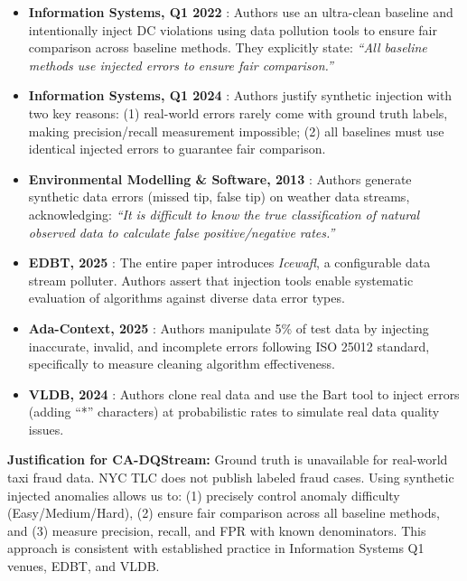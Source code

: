 \begin{itemize}
    \item \textbf{Information Systems, Q1 2022} \citep{DCRepair2022}: Authors use an ultra-clean baseline and intentionally inject DC violations using data pollution tools to ensure fair comparison across baseline methods. They explicitly state: \emph{``All baseline methods use injected errors to ensure fair comparison.''}

    \item \textbf{Information Systems, Q1 2024} \citep{DCRepair2024}: Authors justify synthetic injection with two key reasons: (1) real-world errors rarely come with ground truth labels, making precision/recall measurement impossible; (2) all baselines must use identical injected errors to guarantee fair comparison.

    \item \textbf{Environmental Modelling \& Software, 2013} \citep{bayesianQC2013}: Authors generate synthetic data errors (missed tip, false tip) on weather data streams, acknowledging: \emph{``It is difficult to know the true classification of natural observed data to calculate false positive/negative rates.''}

    \item \textbf{EDBT, 2025} \citep{icewafl2025}: The entire paper introduces \emph{Icewafl}, a configurable data stream polluter. Authors assert that injection tools enable systematic evaluation of algorithms against diverse data error types.

    \item \textbf{Ada-Context, 2025} \citep{adacontext2025}: Authors manipulate 5\% of test data by injecting inaccurate, invalid, and incomplete errors following ISO 25012 standard, specifically to measure cleaning algorithm effectiveness.

    \item \textbf{VLDB, 2024} \citep{dafdiscover2024}: Authors clone real data and use the Bart tool to inject errors (adding ``*'' characters) at probabilistic rates to simulate real data quality issues.
\end{itemize}

\textbf{Justification for CA-DQStream:} Ground truth is unavailable for real-world taxi fraud data. NYC TLC does not publish labeled fraud cases. Using synthetic injected anomalies allows us to: (1) precisely control anomaly difficulty (Easy/Medium/Hard), (2) ensure fair comparison across all baseline methods, and (3) measure precision, recall, and FPR with known denominators. This approach is consistent with established practice in Information Systems Q1 venues, EDBT, and VLDB.

